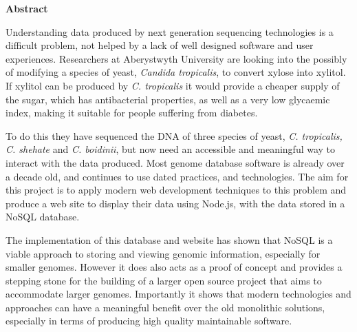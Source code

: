 \thispagestyle{empty}

\begin{center}
    {\LARGE\bf Abstract}
\end{center}

Understanding data produced by next generation sequencing technologies is a difficult problem, not helped by a lack of well designed software and user experiences. Researchers at Aberystwyth University are looking into the possibly of modifying a species of yeast, \textit{Candida tropicalis}, to convert xylose into xylitol.  If xylitol can be produced by \textit{C. tropicalis} it would provide a cheaper supply of the sugar, which has antibacterial properties, as well as a very low glycaemic index, making it suitable for people suffering from diabetes.

To do this they have sequenced the DNA of three species of yeast, \textit{C. tropicalis, C. shehate} and \textit{C. boidinii}, but now need an accessible and meaningful way to interact with the data produced. Most genome database software is already over a decade old, and continues to use dated practices, and technologies. The aim for this project is to apply modern web development techniques to this problem and produce a web site to display their data using Node.js, with the data stored in a NoSQL database. 

The implementation of this database and website has shown that NoSQL is a viable approach to storing and viewing genomic information, especially for smaller genomes. However it does also acts as a proof of concept and provides a stepping stone for the building of a larger open source project that aims to accommodate larger genomes. Importantly it shows that modern technologies and approaches can have a meaningful benefit over the old monolithic solutions, especially in terms of producing high quality maintainable software.
